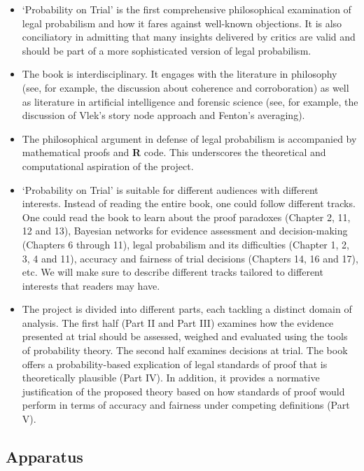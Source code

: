 \documentclass[
  10pt,
  dvipsnames,enabledeprecatedfontcommands]{scrartcl}
\begin{document}
\begin{itemize}
\item
  `Probability on Trial' is the first comprehensive philosophical
  examination of legal probabilism and how it fares against well-known
  objections. It is also conciliatory in admitting that many insights
  delivered by critics are valid and should be part of a more
  sophisticated version of legal probabilism.
\item
  The book is interdisciplinary. It engages with the literature in
  philosophy (see, for example, the discussion about coherence and
  corroboration) as well as literature in artificial intelligence and
  forensic science (see, for example, the discussion of Vlek's story
  node approach and Fenton's averaging).
\item
  The philosophical argument in defense of legal probabilism is
  accompanied by mathematical proofs and \textbf{\textsf{R}} code. This
  underscores the theoretical and computational aspiration of the
  project.
\item
  `Probability on Trial' is suitable for different audiences with
  different interests. Instead of reading the entire book, one could
  follow different tracks. One could read the book to learn about the
  proof paradoxes (Chapter 2, 11, 12 and 13), Bayesian networks for
  evidence assessment and decision-making (Chapters 6 through 11), legal
  probabilism and its difficulties (Chapter 1, 2, 3, 4 and 11), accuracy
  and fairness of trial decisions (Chapters 14, 16 and 17), etc. We will
  make sure to describe different tracks tailored to different interests
  that readers may have.
\item
  The project is divided into different parts, each tackling a distinct
  domain of analysis. The first half (Part II and Part III) examines how
  the evidence presented at trial should be assessed, weighed and
  evaluated using the tools of probability theory. The second half
  examines decisions at trial. The book offers a probability-based
  explication of legal standards of proof that is theoretically
  plausible (Part IV). In addition, it provides a normative
  justification of the proposed theory based on how standards of proof
  would perform in terms of accuracy and fairness under competing
  definitions (Part V).
\end{itemize}

\hypertarget{apparatus}{%
\subsection{Apparatus}\label{apparatus}}
\end{document}
